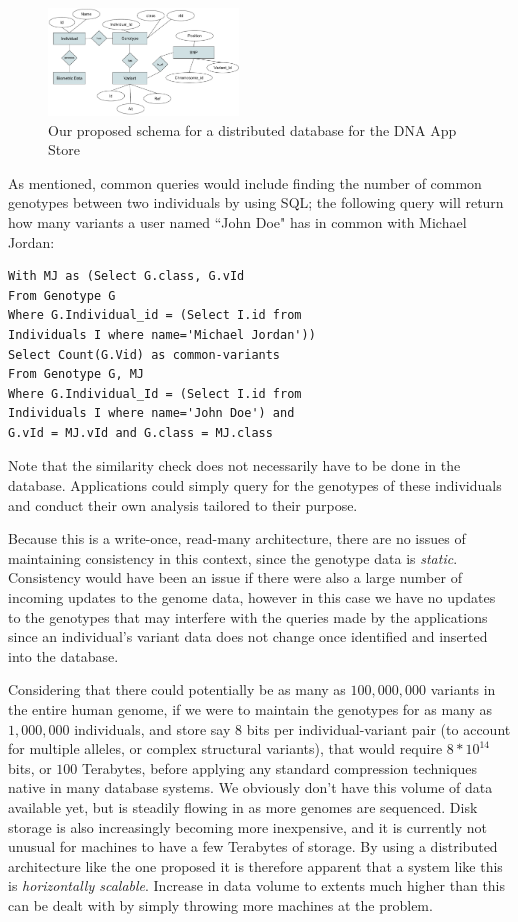 \documentclass[conference,twocolumn,10pt]{IEEEtran}
\begin{document}
\begin{figure}[t]
    \centering
    \includegraphics[width=0.45\textwidth]{schema}
    \caption{Our proposed schema for a distributed database for the DNA App Store}
    \label{fig:schema}
\end{figure}

As mentioned, common queries would include finding the number of common genotypes between two individuals by using SQL; the following query will return how many variants a user named ``John Doe" has in common with Michael Jordan:
\begin{lstlisting}
With MJ as (Select G.class, G.vId
From Genotype G
Where G.Individual_id = (Select I.id from
Individuals I where name='Michael Jordan'))
Select Count(G.Vid) as common-variants
From Genotype G, MJ
Where G.Individual_Id = (Select I.id from
Individuals I where name='John Doe') and
G.vId = MJ.vId and G.class = MJ.class
\end{lstlisting}
Note that the similarity check does not necessarily have to be done in the database. Applications could simply query for the genotypes of these individuals and conduct their own analysis tailored to their purpose.

Because this is a write-once, read-many architecture, there are no issues of maintaining consistency in this context, since the genotype data is \textit{static}. Consistency would have been an issue if there were also a large number of incoming updates to the genome data, however in this case we have no updates to the genotypes that may interfere with the queries made by the applications since an individual’s variant data does not change once identified and inserted into the database.

Considering that there could potentially be as many as $100,000,000$ variants in the entire human genome, if we were to maintain the genotypes for as many as $1,000,000$ individuals, and store say $8$ bits per individual-variant pair (to account for multiple alleles, or complex structural variants), that would require $8*10^{14}$ bits, or $100$ Terabytes, before applying any standard compression techniques native in many database systems. We obviously don't have this volume of data available yet, but is steadily flowing in as more genomes are sequenced. Disk storage is also increasingly becoming more inexpensive, and it is currently not unusual for machines to have a few Terabytes of storage. By using a distributed architecture like the one proposed it is therefore apparent that a system like this is \textit{horizontally scalable}. Increase in data volume to extents much higher than this can be dealt with by simply throwing more machines at the problem.
\end{document}
